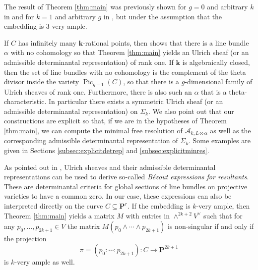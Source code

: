 \documentclass[12pt]{amsart}
\numberwithin{equation}{section}
\numberwithin{thmcounter}{section}
\theoremstyle{definition}
\theoremstyle{claim}
\newcommand{\kk}{\mathbf{k}}
\newcommand{\nP}{\mathbf{P}}
\newcommand{\sA}{\mathscr{A}}
\begin{document}
The result of Theorem \ref{thm:main} was previously shown for $g=0$  and arbitrary $k$ in \cite[Lemma 4.13]{RS} and for $k=1$ and arbitrary $g$ in \cite[Theorem C]{agostinikummer}, but under the assumption that the embedding is $3$-very ample. 
\medskip

If $C$ has infinitely many $\kk$-rational points, then \cite[Proposition 4.4]{eisenbudschreyer} shows that  there is a line bundle $\alpha$ with no cohomology so that Theorem \ref{thm:main} yields  an Ulrich sheaf (or an admissible determinantal representation) of rank one. If $\kk$ is algebraically closed, then the set of line bundles with no cohomology is the complement of the theta divisor inside the variety $\operatorname{Pic}_{g-1}(C)$, so that there is a $g$-dimensional family of Ulrich sheaves of rank one. Furthermore, there is also such an $\alpha$ that is a theta-characteristic. In particular there exists a symmetric Ulrich sheaf (or an admissible determinantal representation) on $\Sigma_k$. We also point out that our constructions are explicit so that, if we are in the hypotheses of Theorem \ref{thm:main}, we can compute the minimal free resolution of $\sA_{k,L\otimes \alpha}$ as well as the corresponding admissible determinantal representation of $\Sigma_k$.  Some examples are given in Sections \ref{subsec:explicitdetrep} and \ref{subsec:explicitminres}.
\medskip

As pointed out in \cite{eisenbudschreyer}, Ulrich sheaves and their admissible determinantal representations can be used to derive so-called \emph{B\'ezout expressions for resultants}. These are determinantal criteria for global sections of line bundles on projective varieties to have a common zero. In our case, these expressions can also be interpreted directly on the curve $C \subseteq \nP^r$. If the embedding is $k$-very ample, then Theorem \ref{thm:main} yields a matrix $M$ with entries in $\wedge^{2k+2}V^{\vee}$ such that for any $p_0,\ldots,p_{2k+1}\in V$ the matrix $M(p_0\wedge \cdots \wedge p_{2k+1})$ is non-singular if and only if the projection
\[ \pi = (p_0:\cdots:p_{2k+1})\colon C \longrightarrow \nP^{2k+1} \]
is $k$-very ample as well. 
\medskip
\end{document}
